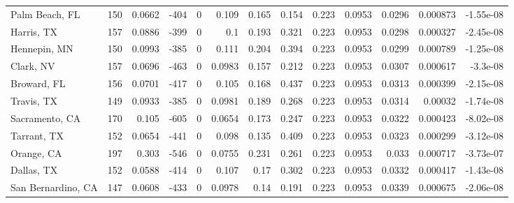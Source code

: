 \documentclass[12pt,letterpaper]{article}
\begin{document}
\begin{appendices}
\begin{sidewaystable}
{\begin{tabular}{lrrrrrrrrrrrr}
 Palm Beach, FL     & 150   & 0.0662  & -404   &     0 &          0.109  &           0.165  &         0.154  &              0.223 &             0.0953 &           0.0296  &        0.000873 &       -1.55e-08  \\
 Harris, TX         & 157   & 0.0886  & -399   &     0 &          0.1    &           0.193  &         0.321  &              0.223 &             0.0953 &           0.0298  &        0.000327 &       -2.45e-08  \\
 Hennepin, MN       & 150   & 0.0993  & -385   &     0 &          0.111  &           0.204  &         0.394  &              0.223 &             0.0953 &           0.0299  &        0.000789 &       -1.25e-08  \\
 Clark, NV          & 157   & 0.0696  & -463   &     0 &          0.0983 &           0.157  &         0.212  &              0.223 &             0.0953 &           0.0307  &        0.000617 &       -3.3e-08   \\
 Broward, FL        & 156   & 0.0701  & -417   &     0 &          0.105  &           0.168  &         0.437  &              0.223 &             0.0953 &           0.0313  &        0.000399 &       -2.15e-08  \\
 Travis, TX         & 149   & 0.0933  & -385   &     0 &          0.0981 &           0.189  &         0.268  &              0.223 &             0.0953 &           0.0314  &        0.00032  &       -1.74e-08  \\
 Sacramento, CA     & 170   & 0.105   & -605   &     0 &          0.0654 &           0.173  &         0.247  &              0.223 &             0.0953 &           0.0322  &        0.000423 &       -8.02e-08  \\
 Tarrant, TX        & 152   & 0.0654  & -441   &     0 &          0.098  &           0.135  &         0.409  &              0.223 &             0.0953 &           0.0323  &        0.000299 &       -3.12e-08  \\
 Orange, CA         & 197   & 0.303   & -546   &     0 &          0.0755 &           0.231  &         0.261  &              0.223 &             0.0953 &           0.033   &        0.000717 &       -3.73e-07  \\
 Dallas, TX         & 152   & 0.0588  & -414   &     0 &          0.107  &           0.17   &         0.302  &              0.223 &             0.0953 &           0.0332  &        0.000417 &       -1.43e-08  \\
 San Bernardino, CA & 147   & 0.0608  & -433   &     0 &          0.0978 &           0.14   &         0.191  &              0.223 &             0.0953 &           0.0339  &        0.000675 &       -2.06e-08  \\

\end{tabular}}
\end{sidewaystable}
\end{appendices}
\end{document}
